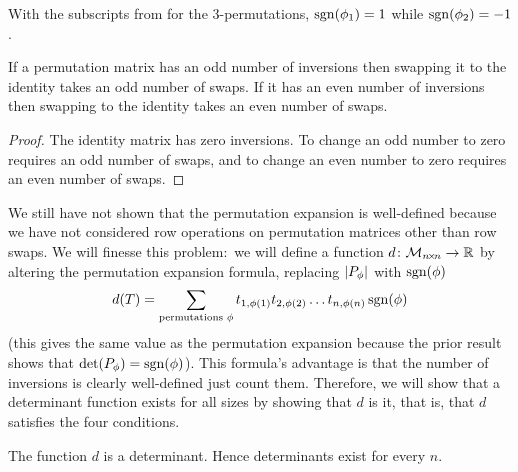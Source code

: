 \begin{example}
With the subscripts from 
for the $3$-permutations,
\( \operatorname{sgn}(\phi_1)=1 \) while \( \operatorname{sgn}(\phi_2)=-1 \).
\end{example}

\begin{corollary}
\label{cor:ParityInversEqParitySwaps}
If a permutation matrix has an odd number of inversions then swapping
it to the identity takes an odd number of swaps.
If it has an even number of inversions then swapping to the
identity takes an even number of swaps.
\end{corollary}

\begin{proof}
The identity matrix has zero inversions.
To change an odd number to zero requires an odd number of swaps,
and to change an even number to zero requires an even number of swaps.
\end{proof}

We still have not shown that the permutation expansion is
well-defined because we have not considered row operations 
on permutation matrices other than row swaps.
We will finesse this problem:~we will define a function
\( \mbox{$d\colon \mathcal{M}_{n \! \times \! n}\to \mathbb{R}$} \)
by altering the permutation expansion formula, replacing
$\deter{P_\phi}$ with $\operatorname{sgn}(\phi)$
\begin{equation*}
  d(T)=
  \sum_{\text{permutations\ }\phi}t_{1,\phi(1)}t_{2,\phi(2)}\dots t_{n,\phi(n)}
                                 \operatorname{sgn}(\phi)
\end{equation*}
(this gives the same value as the permutation expansion
because the prior result shows that $\det(P_\phi)=\operatorname{sgn}(\phi)$).
This formula's advantage is that the number of inversions 
is clearly well-defined \Dash  just count them.
Therefore, we will show that a determinant function exists
for all sizes by showing that \( d \) is it, that is, that $d$
satisfies the four conditions.

\begin{lemma}
The function \( d \) is a determinant.
Hence determinants exist for every $n$.
\end{lemma}


